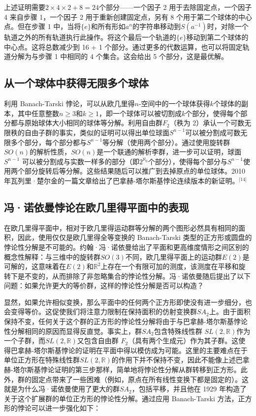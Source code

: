 上述证明需要\( 2 \times 4 \times 2 + 8 = 24 \)个部分——一个因子 2 用于去除固定点，一个因子 4 来自步骤 1，一个因子 2 用于重新创建固定点，另有 8 个用于第二个球体的中心点。但在步骤 1 中，当将\( \{e\} \)和所有形如\( a^n \)的字符串移动到\( S(a^{-1}) \)时，对除一个轨道之外的所有轨道执行此操作。将这个最后一个轨道的\( \{e\} \)移动到第二个球体的中心点。这将总数减少到 16 + 1 个部分。通过更多的代数运算，也可以将固定轨道分解为与步骤 1 中相同的 4 个集合。这会给出 5 个部分，这是最优解。
\subsection{从一个球体中获得无限多个球体}  
利用 Banach-Tarski 悖论，可以从欧几里得\( n \)-空间中的一个球体获得\( k \)个球体的副本，其中任意整数\( n \geq 3 \)和\( k \geq 1 \)，即一个球体可以被切割成\( k \)个部分，使得每个部分都与原始球体大小相同的球体等分解。利用自由群\( F_2 \)（秩为 2）承认一个可数无限秩的自由子群的事实，类似的证明可以得出单位球面\( S^{n-1} \)可以被分割成可数无限多个部分，每个部分都与\( S^{n-1} \)等分解（使用两个部分）。通过使用旋转群\( SO(n) \)的解析性质，\( SO(n) \)是一个联通的解析李群，进一步可以证明，球面\( S^{n-1} \) 可以被分割成与实数一样多的部分（即\( 2^{\aleph_0} \)个部分），使得每个部分与\( S^{n-1} \)使用两个部分旋转后等分解。这些结果随后可以推广到去掉原点的单位球体。2010 年瓦列里·楚尔金的一篇文章给出了巴拿赫-塔尔斯基悖论连续版本的新证明。\(^\text{[14]}\)
\subsection{冯·诺依曼悖论在欧几里得平面中的表现 } 
在欧几里得平面中，相对于欧几里得运动群等分解的两个图形必然具有相同的面积，因此，使用仅仅是欧几里得全等变换的 Banach-Tarski 类型的正方形或圆盘的悖论性分解是不可能的。约翰·冯·诺依曼给出了平面和更高维度情形之间区别的概念性解释：与三维中的旋转群\( SO(3) \)不同，欧几里得平面上的运动群\( E(2) \)是可解的，这意味着在\( E(2) \)和\( \mathbb{R}^2 \)上存在一个有限可加的测度，该测度在平移和旋转下是不变的，从而排除了非忽略集合的悖论性分解。冯·诺依曼随后提出了以下问题：如果允许更大的等价群，这样的悖论性分解是否可以构造？

显然，如果允许相似变换，那么平面中的任何两个正方形即使没有进一步细分，也会变得等价。这促使我们将注意力限制在保持面积的仿射变换群\( SA_2 \)上。由于面积保持不变，任何关于这个群的正方形的悖论性分解将由于与巴拿赫-塔尔斯基悖论性分解相同的原因而显得反直觉。事实上，群\( SA_2 \)包含特殊线性群 \( SL(2, \mathbb{R}) \)作为一个子群，而\( SL(2, \mathbb{R}) \)又包含自由群 \( F_2 \)（具有两个生成元）作为其子群。这使得巴拿赫-塔尔斯基悖论的证明在平面中得以模仿成为可能。这里的主要难点在于单位正方形在特殊线性群\( SL(2, \mathbb{R}) \)的作用下并不保持不变，因此不能像上述巴拿赫-塔尔斯基悖论证明的第三步那样，简单地将悖论性分解从群转移到正方形。此外，群的固定点带来了一些困难（例如，原点在所有线性变换下都是固定的）。这就是为什么冯·诺依曼使用了更大的群\( SA_2 \)，包括平移，并且他在 1929 年构造了关于这个扩展群的单位正方形的悖论性分解。通过应用 Banach-Tarski 方法，正方形的悖论可以进一步强化如下：

